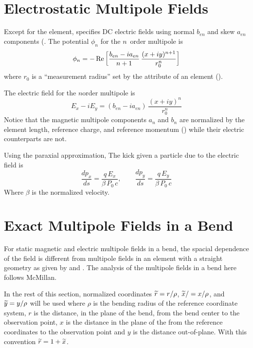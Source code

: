 \section{Electrostatic Multipole Fields}
\label{s:elec.field}

Except for the  element, \bmad specifies DC electric fields using normal
$b_{en}$ and skew $a_{en}$ components (. The potential $\phi_n$ for the
$n$\Th\ order multipole is
\begin{equation}
  \phi_n = -\operatorname{Re} \left[ \frac{b_{en} - i a_{en}}{n + 1} \, \frac{(x + i y)^{n+1}}{r_0^n} \right]
  \label{pbian1}
\end{equation}
where $r_0$ is a ``measurement radius'' set by the  attribute of an element
().

The electric field for the $n$\Th order multipole is
\begin{equation}
  E_x - i E_y = (b_{en} - i a_{en}) \, \frac{(x + i y)^n}{r_0^n}
  \label{exiey}
\end{equation}
Notice that the magnetic multipole components $a_n$ and $b_n$ are normalized by the
element length, reference charge, and reference momentum () while their electric
counterparts are not.

Using the paraxial approximation, The kick given a particle due to the electric field is
\begin{equation}
  \frac{dp_x}{ds} = \frac{q \, E_x}{\beta \, P_0 \, c}, \qquad \frac{dp_y}{ds} = \frac{q \, E_y}{\beta \, P_0 \, c}
\end{equation}
Where $\beta$ is the normalized velocity.

\section{Exact Multipole Fields in a Bend}
\label{s:field.exact}

For static magnetic and electric multipole fields in a bend, the spacial dependence of the
field is different from multipole fields in an element with a straight geometry as given
by  and . The analysis of the multipole fields in a bend here follows
McMillan\cite{b:mcmillan}.  

In the rest of this section, normalized coordinates ${\widetilde r} = r / \rho$, ${\widetilde x} / = x /
\rho$, and ${\widetilde y} = y / \rho$ will be used where $\rho$ is the bending radius of the
reference coordinate system, $r$ is the distance, in the plane of the bend, from the bend
center to the observation point, $x$ is the distance in the plane of the from the reference
coordinates to the observation point and $y$ is the distance out-of-plane. With this
convention ${\widetilde r} = 1 + {\widetilde x}$.


